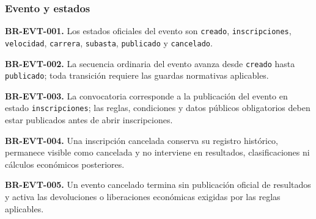 \documentclass[10pt,letterpaper]{article}
\begin{document}
\subsubsection{Evento y estados}
\noindent\textbf{BR-EVT-001.} Los estados oficiales del evento son \texttt{creado}, \texttt{inscripciones}, \texttt{velocidad}, \texttt{carrera}, \texttt{subasta}, \texttt{publicado} y \texttt{cancelado}.\par
\noindent\textbf{BR-EVT-002.} La secuencia ordinaria del evento avanza desde \texttt{creado} hasta \texttt{publicado}; toda transición requiere las guardas normativas aplicables.\par
\noindent\textbf{BR-EVT-003.} La convocatoria corresponde a la publicación del evento en estado \texttt{inscripciones}; las reglas, condiciones y datos públicos obligatorios deben estar publicados antes de abrir inscripciones.\par
\noindent\textbf{BR-EVT-004.} Una inscripción cancelada conserva su registro histórico, permanece visible como cancelada y no interviene en resultados, clasificaciones ni cálculos económicos posteriores.\par
\noindent\textbf{BR-EVT-005.} Un evento cancelado termina sin publicación oficial de resultados y activa las devoluciones o liberaciones económicas exigidas por las reglas aplicables.\par
\end{document}
